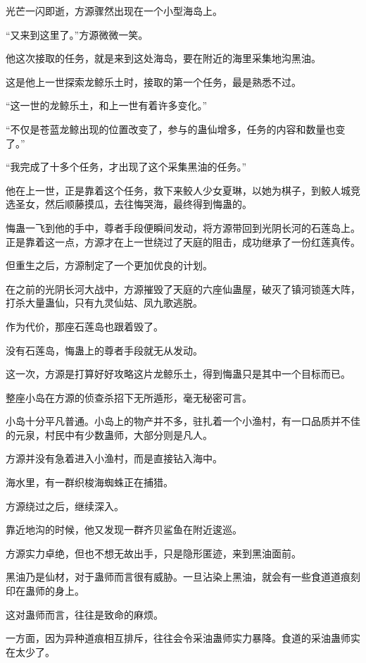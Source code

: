 
\begin{this_body}

光芒一闪即逝，方源骤然出现在一个小型海岛上。

“又来到这里了。”方源微微一笑。

他这次接取的任务，就是来到这处海岛，要在附近的海里采集地沟黑油。

这是他上一世探索龙鲸乐土时，接取的第一个任务，最是熟悉不过。

“这一世的龙鲸乐土，和上一世有着许多变化。”

“不仅是苍蓝龙鲸出现的位置改变了，参与的蛊仙增多，任务的内容和数量也变了。”

“我完成了十多个任务，才出现了这个采集黑油的任务。”

他在上一世，正是靠着这个任务，救下来鲛人少女夏琳，以她为棋子，到鲛人城竞选圣女，然后顺藤摸瓜，去往悔哭海，最终得到悔蛊的。

悔蛊一飞到他的手中，尊者手段便瞬间发动，将方源带回到光阴长河的石莲岛上。正是靠着这一点，方源才在上一世绕过了天庭的阻击，成功继承了一份红莲真传。

但重生之后，方源制定了一个更加优良的计划。

在之前的光阴长河大战中，方源摧毁了天庭的六座仙蛊屋，破灭了镇河锁莲大阵，打杀大量蛊仙，只有九灵仙姑、凤九歌逃脱。

作为代价，那座石莲岛也跟着毁了。

没有石莲岛，悔蛊上的尊者手段就无从发动。

这一次，方源是打算好好攻略这片龙鲸乐土，得到悔蛊只是其中一个目标而已。

整座小岛在方源的侦查杀招下无所遁形，毫无秘密可言。

小岛十分平凡普通。小岛上的物产并不多，驻扎着一个小渔村，有一口品质并不佳的元泉，村民中有少数蛊师，大部分则是凡人。

方源并没有急着进入小渔村，而是直接钻入海中。

海水里，有一群织梭海蜘蛛正在捕猎。

方源绕过之后，继续深入。

靠近地沟的时候，他又发现一群齐贝鲨鱼在附近逡巡。

方源实力卓绝，但也不想无故出手，只是隐形匿迹，来到黑油面前。

黑油乃是仙材，对于蛊师而言很有威胁。一旦沾染上黑油，就会有一些食道道痕刻印在蛊师的身上。

这对蛊师而言，往往是致命的麻烦。

一方面，因为异种道痕相互排斥，往往会令采油蛊师实力暴降。食道的采油蛊师实在太少了。


\end{this_body}

